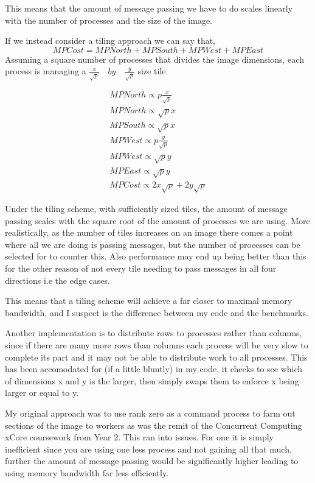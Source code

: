 \documentclass[10pt]{article}
\begin{document}
    This means that the amount of message passing we have to do scales linearly with the number of processes and the size of the image.

    If we instead consider a tiling approach we can say that,
    $$MP Cost = MP North + MP South + MP West + MP East$$
    Assuming a square number of processes that divides the image dimensions, each process is managing a $\frac{x}{\sqrt{p}} \quad by \quad \frac{y}{\sqrt{p}}$ size tile.

    \begin{align*}
      MP North \propto p\frac{x}{\sqrt{p}} \\
      MP North \propto \sqrt{p}x \\
      MP South \propto \sqrt{p}x \\
      MP West \propto p\frac{y}{\sqrt{p}} \\
      MP West \propto \sqrt{p}y \\
      MP East \propto \sqrt{p}y \\
      MP Cost \propto 2x\sqrt{p}+2y\sqrt{p}
    \end{align*}

    Under the tiling scheme, with sufficiently sized tiles, the amount of message passing scales with the square root of the amount of processes we are using.
    More realistically, as the number of tiles increases on an image there comes a point where all we are doing is passing messages, but the number of processes
    can be selected for to counter this. Also performance may end up being better than this for the other reason of not every tile
    needing to pass messages in all four directions i.e the edge cases.

    This means that a tiling scheme will achieve a far closer to maximal memory bandwidth, and I suspect is the difference between my code and the benchmarks.

    Another implementation is to distribute rows to processes rather than columns, since if there are many more rows than columns each process will be very slow
    to complete its part and it may not be able to distribute work to all processes. This has been accomodated for (if a little bluntly) in my code, it checks to
    see which of dimensions x and y is the larger, then simply swaps them to enforce x being larger or equal to y.

    My original approach was to use rank zero as a command process to farm out sections of the image to workers as was the remit of the Concurrent Computing
    xCore coursework from Year 2. This ran into issues. For one it is simply inefficient since you are using one less process and not gaining all that much,
    further the amount of message passing would be significantly higher leading to using memory bandwidth far less efficiently.












  
\end{document}
